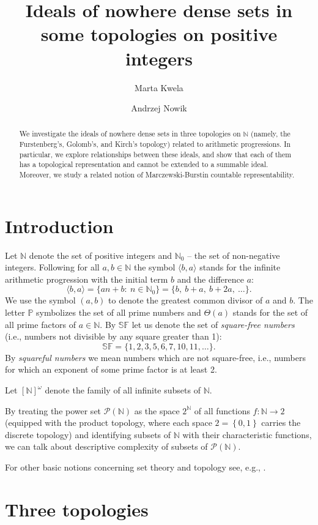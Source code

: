\documentclass{amsart}
\title[Ideals of nowhere dense sets in some topologies on positive integers]{Ideals of nowhere dense sets in some topologies on positive integers}
\author{Marta Kwela}
\author{Andrzej Nowik}
\theoremstyle{definition}
\newcommand{\N}{{\mathbb N}}
\newcommand{\SqrFr}{\mathbb{SF}}
\newcommand{\InfSubs}{[\N]^{\omega}}
\newcommand{\arithseq}[2]{\langle#2, #1\rangle}
\begin{document}
\begin{abstract}
We investigate the ideals of nowhere dense sets in three topologies on $\N$ (namely, the Furstenberg's, Golomb's, and Kirch's topology) related to arithmetic progressions. In particular, we explore relationships between these ideals, and show that each of them has a topological representation and cannot be extended to a summable ideal. Moreover, we study a related notion of Marczewski-Burstin countable representability.
\end{abstract}
\maketitle


\section{Introduction}

Let $\N$ denote the set of positive integers and $\N_0$ -- the set of non-negative integers. Following \cite{K} for all $a,b\in\N$ the symbol $\arithseq{a}{b}$ stands for the infinite arithmetic progression with the initial term $b$ and the difference $a$:
$$\arithseq{a}{b} = \{an+b :\ n\in\N_0\} = \{b,\ b+a,\ b+2a,\ \ldots\}. $$
We use the symbol $(a,b)$ to denote the greatest common divisor of $a$ and $b$. 
The letter $\mathbb{P}$ symbolizes the set of all prime numbers and $\Theta(a)$ stands for the set of all prime factors of $a\in\N$.
By $\mathbb{SF}$ let us denote the set of \emph{square-free numbers} (i.e., numbers not divisible by any square greater than 1):
$$\SqrFr = \{1,2,3,5,6,7,10,11,\ldots\}.$$
By \emph{squareful numbers} we mean numbers which are not square-free, i.e., numbers for which an exponent of some prime factor is at least 2.

Let $\InfSubs$ denote the family of all infinite subsets of $\N$. 

By treating the power set $\mathcal{P}(\N)$ as the space $2^\N$ of all functions $f\colon\N\to 2$ (equipped with the product topology, where each space $2= \left\{0,1\right\}$ carries the discrete topology) and identifying subsets of $\N$ with their characteristic functions, we can talk about descriptive complexity of subsets of $\mathcal{P}(\N)$.

For other basic notions concerning set theory and topology see, e.g., \cite{Kechris}.


\section*{Three topologies}
\end{document}
